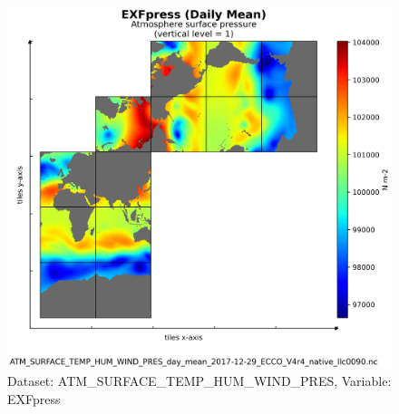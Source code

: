 \begin{figure}[H]
\centering
\includegraphics[scale=0.55]{../images/plots/v4r4/native_plots/Atmosphere_Surface_Temperature_Humidity_Wind_and_Pressure/EXFpress.png}
\caption{Dataset: ATM\_SURFACE\_TEMP\_HUM\_WIND\_PRES, Variable: EXFpress}
\label{tab:table-ATM_SURFACE_TEMP_HUM_WIND_PRES_EXFpress-Plot}
\end{figure}
\newpage
\pagebreak
